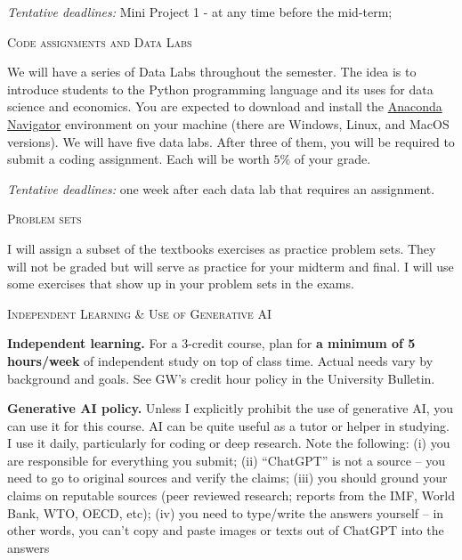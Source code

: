 \documentclass[11pt]{article}
\begin{document}
\smallskip
\textit{Tentative deadlines:} Mini Project 1 - at any time before the mid-term; 

\bigskip

\noindent\textsc{Code assignments and Data Labs}

\smallskip
We will have a series of Data Labs throughout the semester. The idea is to introduce students to the Python programming language and its uses for data science and economics. You are expected to download and install the \href{https://www.anaconda.com/download}{Anaconda Navigator} environment on your machine (there are Windows, Linux, and MacOS versions). We will have five data labs. After three of them, you will be required to submit a coding assignment. Each will be worth $5\%$ of your grade. 

\smallskip
\textit{Tentative deadlines:} one week after each data lab that requires an assignment.

\bigskip

\noindent\textsc{Problem sets}

\smallskip
I will assign a subset of the textbooks exercises as practice problem sets. They will not be graded but will serve as practice for your midterm and final. I will use some exercises that show up in your problem sets in the exams.


\bigskip


\noindent\textsc{Independent Learning \& Use of Generative AI}

\smallskip
\textbf{Independent learning.} For a 3-credit course, plan for \textbf{a minimum of 5 hours/week} of independent study on top of class time. Actual needs vary by background and goals. See GW’s credit hour policy in the University Bulletin.

\smallskip
\textbf{Generative AI policy.} Unless I explicitly prohibit the use of generative AI, you can use it for this course. AI can be quite useful as a tutor or helper in studying. I use it daily, particularly for coding or deep research. Note the following: (i) you are responsible for everything you submit; (ii) ``ChatGPT'' is not a source -- you need to go to original sources and verify the claims; (iii) you should ground your claims on reputable sources (peer reviewed research; reports from the IMF, World Bank, WTO, OECD, etc); (iv) you need to type/write the answers yourself -- in other words, you can't copy and paste images or texts out of ChatGPT into the answers
\end{document}
